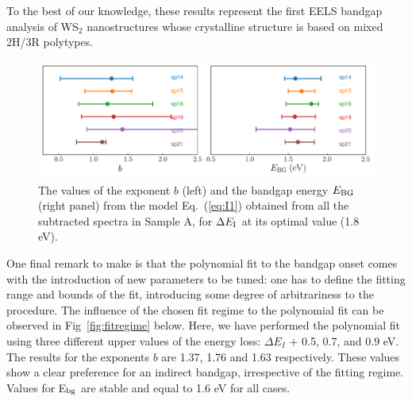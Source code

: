 To the best of our knowledge,
these results represent the first EELS bandgap analysis of WS$_2$ nanostructures
whose crystalline structure is based on mixed 2H/3R polytypes.

\begin{figure}[H]
\begin{centering}
  \includegraphics[width=0.9\linewidth]{plots/bg_stability.pdf} 
  \caption{The values of the exponent $b$ (left)
    and the bandgap energy $E_{\rm BG}$ (right panel) from the model Eq.~(\ref{eq:I1})
    obtained from all the subtracted spectra in Sample A, 
    for $\Delta E_{\rm I}$ at its optimal value (1.8 eV). 
  }
\label{fig:bgstability}
\end{centering}
\end{figure}

One final remark to make is that the polynomial fit to the bandgap onset
comes with the introduction of new parameters to be tuned:
one has to define the fitting range and bounds of the fit, 
introducing some degree of arbitrariness to the procedure.
%
The influence of the chosen fit regime to the polynomial fit
can be observed in Fig~\ref{fig:fitregime} below.
%
Here, we have performed the polynomial fit using three different
upper values of the energy loss: $\Delta E_I$ + 0.5, 0.7, and 0.9 eV. 
%
The results for the exponents $b$ are 1.37, 1.76 and 1.63 respectively. 
%
These values show a clear preference for an indirect bandgap, 
irrespective of the fitting regime. 
%
Values for E$_{\rm bg}$ are stable and equal to 1.6 eV for all cases.

